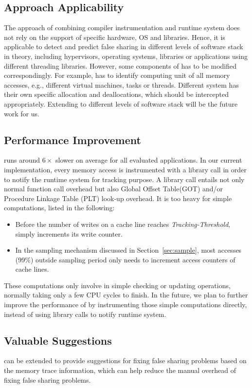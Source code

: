 \label{sec:futurework}

\subsection{Approach Applicability}
The approach of combining compiler instrumentation and runtime system does not rely on the support of specific hardware, OS and libraries.
Hence, it is applicable to detect and predict false sharing in different levels of 
software stack in theory, including hypervisors, operating systems, libraries or 
applications using different threading libraries.
However, some components of \Predator{} has to be 
modified correspondingly.
For example, \Predator{} has to identify computing unit of all memory accesses, e.g., different virtual machines, tasks or threads. 
Different system has their own specific allocation and deallocations, which should be intercepted appropriately. Extending \Predator{} to different levels of software stack will be the future work for us.


\subsection{Performance Improvement}
\Predator{} runs around $6\times$ slower on average for all evaluated applications. 
In our current implementation, every memory access is instrumented with a library call 
in order to notify the runtime system for tracking purpose. A library call entails not only normal function call overhead but also Global Offset Table(GOT) and/or Procedure Linkage Table (PLT) look-up overhead. 
It is too heavy for simple computations, listed in the following:

\begin{itemize}
\item
Before the number of writes on a cache line reaches {\it Tracking-Threshold},  \Predator{} simply increments its write counter.

\item
In the sampling mechanism discussed in Section~\ref{sec:sample}, most accesses (99\%) outside sampling period only needs to increment access counters of cache lines.
\end{itemize}

These computations only involve in simple checking or updating operations, normally taking only a few CPU cycles to finish. 
In the future, we plan to further improve the performance of \Predator{} by instrumenting those simple computations directly, instead of using library calls to notify runtime system.

\subsection{Valuable Suggestions}
\Predator{} can be extended to provide suggestions for fixing false sharing problems based on the memory trace information, which can help reduce the manual overhead of fixing false sharing problems.  
